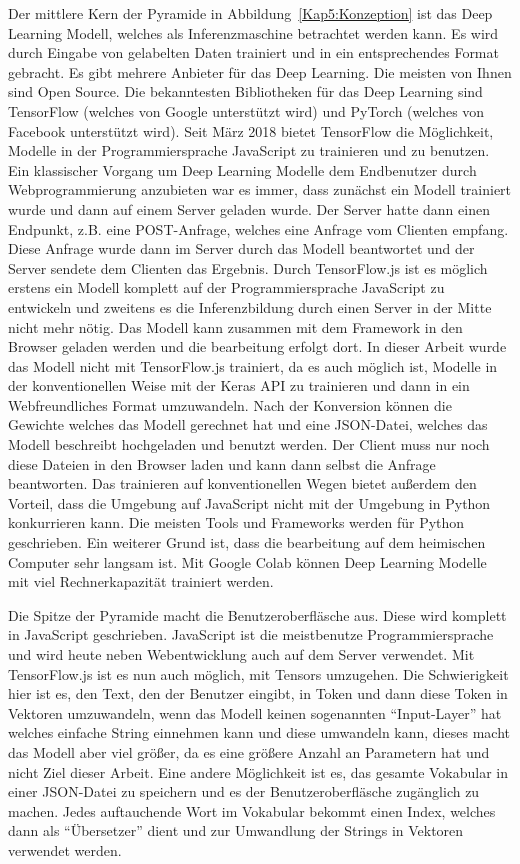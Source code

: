 Der mittlere Kern der Pyramide in Abbildung~\ref{Kap5:Konzeption} ist das Deep Learning Modell, welches als Inferenzmaschine betrachtet werden kann. Es wird durch Eingabe von gelabelten Daten trainiert und in ein entsprechendes Format gebracht. Es gibt mehrere Anbieter für das Deep Learning. Die meisten von Ihnen sind Open Source. Die bekanntesten Bibliotheken für das Deep Learning sind TensorFlow (welches von Google unterstützt wird) und PyTorch (welches von Facebook unterstützt wird). Seit März 2018 bietet TensorFlow die Möglichkeit, Modelle in der Programmiersprache JavaScript zu trainieren und zu benutzen. Ein klassischer Vorgang um Deep Learning Modelle dem Endbenutzer durch Webprogrammierung anzubieten war es immer, dass zunächst ein Modell trainiert wurde und dann auf einem Server geladen wurde. Der Server hatte dann einen Endpunkt, z.B. eine POST-Anfrage, welches eine Anfrage vom Clienten empfang. Diese Anfrage wurde dann im Server durch das Modell beantwortet und der Server sendete dem Clienten das Ergebnis. Durch TensorFlow.js ist es möglich erstens ein Modell komplett auf der Programmiersprache JavaScript zu entwickeln und zweitens es die Inferenzbildung durch einen Server in der Mitte nicht mehr nötig. Das Modell kann zusammen mit dem Framework in den Browser geladen werden und die bearbeitung erfolgt dort. In dieser Arbeit wurde das Modell nicht mit TensorFlow.js trainiert, da es auch möglich ist, Modelle in der konventionellen Weise mit der Keras API zu trainieren und dann in ein Webfreundliches Format umzuwandeln. Nach der Konversion können die Gewichte welches das Modell gerechnet hat und eine JSON-Datei, welches das Modell beschreibt hochgeladen und benutzt werden. Der Client muss nur noch diese Dateien in den Browser laden und kann dann selbst die Anfrage beantworten. Das trainieren auf konventionellen Wegen bietet außerdem den Vorteil, dass die Umgebung auf JavaScript nicht mit der Umgebung in Python konkurrieren kann. Die meisten Tools und Frameworks werden für Python geschrieben. Ein weiterer Grund ist, dass die bearbeitung auf dem heimischen Computer sehr langsam ist. Mit Google Colab können Deep Learning Modelle mit viel Rechnerkapazität trainiert werden.

Die Spitze der Pyramide macht die Benutzeroberfläsche aus. Diese wird komplett in JavaScript geschrieben. JavaScript ist die meistbenutze Programmiersprache und wird heute neben Webentwicklung auch auf dem Server verwendet. Mit TensorFlow.js ist es nun auch möglich, mit Tensors umzugehen. Die Schwierigkeit hier ist es, den Text, den der Benutzer eingibt, in Token und dann diese Token in Vektoren umzuwandeln, wenn das Modell keinen sogenannten \enquote{Input-Layer} hat welches einfache String einnehmen kann und diese umwandeln kann, dieses macht das Modell aber viel größer, da es eine größere Anzahl an Parametern hat und nicht Ziel dieser Arbeit. Eine andere Möglichkeit ist es, das gesamte Vokabular in einer JSON-Datei zu speichern und es der Benutzeroberfläsche zugänglich zu machen. Jedes auftauchende Wort im Vokabular bekommt einen Index, welches dann als \enquote{Übersetzer} dient und zur Umwandlung der Strings in Vektoren verwendet werden.